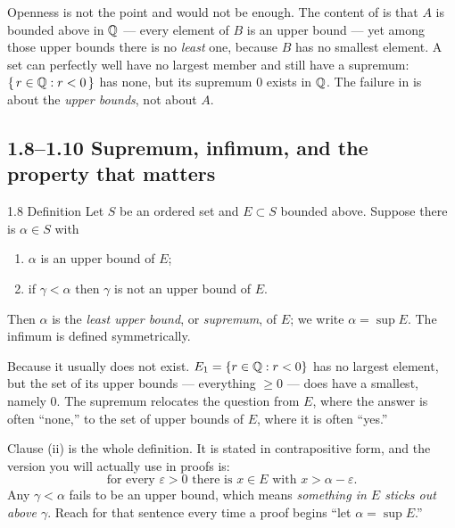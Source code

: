 \documentclass[11pt,twoside]{article}
\begin{document}
\begin{pitfall}
Openness is not the point and would not be enough. The content of  is
that $A$ is bounded above in $\mathbb{Q}$ --- every element of $B$ is an upper bound ---
yet among those upper bounds there is no \emph{least} one, because $B$ has no
smallest element. A set can perfectly well have no largest member and still have
a supremum: $\{\,r \in \mathbb{Q} : r < 0\,\}$ has none, but its supremum $0$ exists in
$\mathbb{Q}$. The failure in  is about the \emph{upper bounds}, not about $A$.
\end{pitfall}

\subsection*{1.8--1.10 \; Supremum, infimum, and the property that matters}


\begin{rudinbox}{\textsc{1.8} Definition}
Let $S$ be an ordered set and $E \subset S$ bounded above. Suppose there is
$\alpha \in S$ with
\begin{enumerate}[label=(\roman*), leftmargin=2em, itemsep=1pt]
  \item $\alpha$ is an upper bound of $E$;
  \item if $\gamma < \alpha$ then $\gamma$ is not an upper bound of $E$.
\end{enumerate}
Then $\alpha$ is the \emph{least upper bound}, or \emph{supremum}, of $E$;
we write $\alpha = \sup E$. The infimum is defined symmetrically.
\end{rudinbox}

\begin{unpack}
Because it usually does not exist. $E_1 = \{r \in \mathbb{Q} : r < 0\}$ has no largest
element, but the set of its upper bounds --- everything ${}\ge 0$ --- does have a
smallest, namely $0$. The supremum relocates the question from $E$, where the
answer is often ``none,'' to the set of upper bounds of $E$, where it is often
``yes.''

Clause (ii) is the whole definition. It is stated in contrapositive form, and
the version you will actually use in proofs is:
\[
  \text{for every } \varepsilon > 0 \text{ there is } x \in E
  \text{ with } x > \alpha - \varepsilon.
\]
Any $\gamma < \alpha$ fails to be an upper bound, which means \emph{something in
$E$ sticks out above $\gamma$}. Reach for that sentence every time a proof
begins ``let $\alpha = \sup E$.''
\end{unpack}
\end{document}
